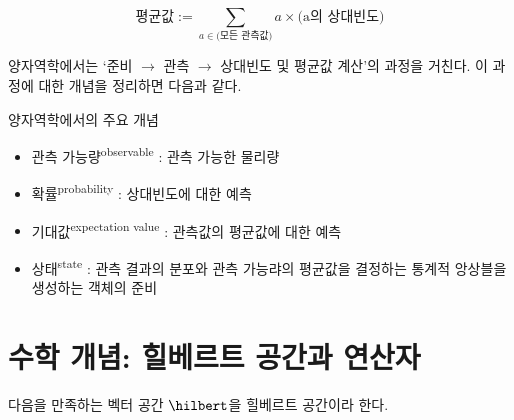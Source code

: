 \documentclass[./note.tex]{subfiles}
\begin{document}
\begin{definition}[평균값]
  \begin{equation}
    \text{평균값} := \sum_{a\in\text{(모든 관측값)}} a \times \text{(a의 상대빈도)}
  \end{equation}
\end{definition}
양자역학에서는 `준비 $\rightarrow$ 관측 $\rightarrow$ 상대빈도 및 평균값 계산'의 과정을 거친다. 이 과정에 대한 개념을 정리하면 다음과 같다.
\begin{note}
  양자역학에서의 주요 개념
  \begin{itemize}
    \item
      관측 가능량\textsuperscript{observable} : 관측 가능한 물리량
    \item
      확률\textsuperscript{probability} : 상대빈도에 대한 예측
    \item
      기대값\textsuperscript{expectation value} : 관측값의 평균값에 대한 예측
    \item
      상태\textsuperscript{state} : 관측 결과의 분포와 관측 가능랴의 평균값을 결정하는 통계적 앙상블을 생성하는 객체의 준비
  \end{itemize}
\end{note}


\section{수학 개념: 힐베르트 공간과 연산자}
\begin{definition}[힐베르트 공간]
  다음을 만족하는 벡터 공간 $\hilbert$을 힐베르트 공간이라 한다.
\end{definition}
\end{document}
